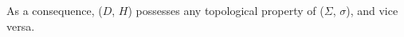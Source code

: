 As a consequence, ($D$, $H$) possesses any topological property of ($\Sigma$, $\sigma$), and vice versa.



